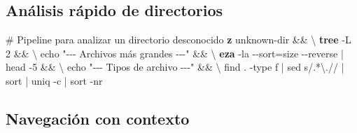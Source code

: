 \documentclass[
  11pt,
  letterpaper,
  oneside,
  openany]{scrbook}
\newenvironment{Shaded}{}{}
\newcommand{\AttributeTok}[1]{\textcolor[rgb]{0.84,0.23,0.29}{#1}}
\newcommand{\BuiltInTok}[1]{\textcolor[rgb]{0.84,0.23,0.29}{#1}}
\newcommand{\CommentTok}[1]{\textcolor[rgb]{0.42,0.45,0.49}{#1}}
\newcommand{\DataTypeTok}[1]{\textcolor[rgb]{0.84,0.23,0.29}{#1}}
\newcommand{\ExtensionTok}[1]{\textcolor[rgb]{0.84,0.23,0.29}{\textbf{#1}}}
\newcommand{\FunctionTok}[1]{\textcolor[rgb]{0.44,0.26,0.76}{#1}}
\newcommand{\KeywordTok}[1]{\textcolor[rgb]{0.84,0.23,0.29}{#1}}
\newcommand{\NormalTok}[1]{\textcolor[rgb]{0.14,0.16,0.18}{#1}}
\newcommand{\OperatorTok}[1]{\textcolor[rgb]{0.14,0.16,0.18}{#1}}
\newcommand{\StringTok}[1]{\textcolor[rgb]{0.01,0.18,0.38}{#1}}
\newcommand{\VariableTok}[1]{\textcolor[rgb]{0.89,0.38,0.04}{#1}}
\begin{document}
\subsection{Análisis rápido de
directorios}\label{anuxe1lisis-ruxe1pido-de-directorios}

\begin{Shaded}
\begin{Highlighting}[]
\CommentTok{\# Pipeline para analizar un directorio desconocido}
\ExtensionTok{z}\NormalTok{ unknown{-}dir }\KeywordTok{\&\&} \DataTypeTok{\textbackslash{}}
\ExtensionTok{tree} \AttributeTok{{-}L}\NormalTok{ 2 }\KeywordTok{\&\&} \DataTypeTok{\textbackslash{}}
\BuiltInTok{echo} \StringTok{"{-}{-}{-} Archivos más grandes {-}{-}{-}"} \KeywordTok{\&\&} \DataTypeTok{\textbackslash{}}
\ExtensionTok{eza} \AttributeTok{{-}la} \AttributeTok{{-}{-}sort}\OperatorTok{=}\NormalTok{size }\AttributeTok{{-}{-}reverse} \KeywordTok{|} \FunctionTok{head} \AttributeTok{{-}5} \KeywordTok{\&\&} \DataTypeTok{\textbackslash{}}
\BuiltInTok{echo} \StringTok{"{-}{-}{-} Tipos de archivo {-}{-}{-}"} \KeywordTok{\&\&} \DataTypeTok{\textbackslash{}}
\FunctionTok{find}\NormalTok{ . }\AttributeTok{{-}type}\NormalTok{ f }\KeywordTok{|} \FunctionTok{sed} \StringTok{\textquotesingle{}s/.*\textbackslash{}.//\textquotesingle{}} \KeywordTok{|} \FunctionTok{sort} \KeywordTok{|} \FunctionTok{uniq} \AttributeTok{{-}c} \KeywordTok{|} \FunctionTok{sort} \AttributeTok{{-}nr}
\end{Highlighting}
\end{Shaded}

\subsection{Navegación con contexto}\label{navegaciuxf3n-con-contexto}

\begin{Shaded}
\end{Shaded}
\end{document}
